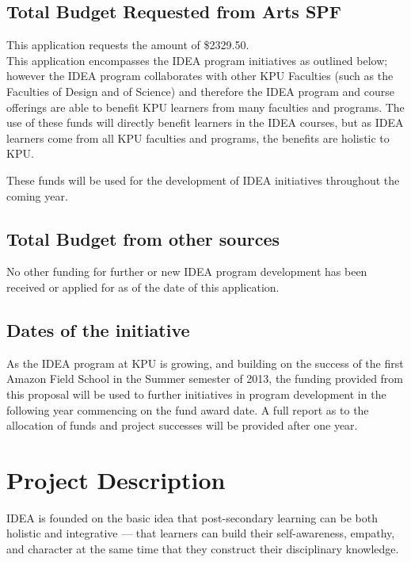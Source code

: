 \documentclass[11pt, letterpaper]{article}
\begin{document}
\subsection{Total Budget Requested from Arts SPF}

This application requests the amount of \$2329.50.\\[1em]
\noindent
This application encompasses the IDEA program initiatives as outlined
below; however the IDEA program collaborates with other KPU Faculties
(such as the Faculties of Design and of Science) and therefore the IDEA
program and course offerings are able to benefit KPU learners from many
faculties and programs. The use of these funds will directly benefit
learners in the IDEA courses, but as IDEA learners come from all KPU
faculties and programs, the benefits are holistic to KPU.

These funds will be used for the development of IDEA initiatives
throughout the coming year.

\subsection{Total Budget from other sources}

No other funding for further or new IDEA program development has been
received or applied for as of the date of this application.

\subsection{Dates of the initiative}

As the IDEA program at KPU is growing, and building on the success of
the first Amazon Field School in the Summer semester of 2013, the
funding provided from this proposal will be used to further initiatives
in program development in the following year commencing on the fund
award date. A full report as to the allocation of funds and project
successes will be provided after one year.

\section{Project Description}

IDEA is founded on the basic idea that post-secondary learning can be
both holistic and integrative --- that learners can build their
self-awareness, empathy, and character at the same time that they
construct their disciplinary knowledge.
\end{document}
